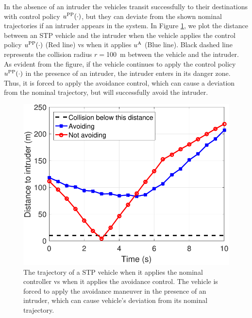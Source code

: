 In the absence of an intruder the vehicles transit successfully to their destinations with control policy $u^{\text{PP}}(\cdot)$, but they can deviate from the shown nominal trajectories if an intruder appears in the system. In Figure \ref{fig:trajComparison}, we plot the distance between an STP vehicle and the intruder when the vehicle applies the control policy $u^{\text{PP}}(\cdot)$ (Red line) vs when it applies ${u^{\text{A}}}$ (Blue line). Black dashed line represents the collision radius $r=$\SI{100}{\m} between the vehicle and the intruder. As evident from the figure, if the vehicle continues to apply the control policy $u^{\text{PP}}(\cdot)$ in the presence of an intruder, the intruder enters in its danger zone. Thus, it is forced to apply the avoidance control, which can cause a deviation from the nominal trajectory, but will successfully avoid the intruder.
\begin{figure}
  \centering
  \includegraphics[width=0.6\columnwidth]{figs/simulateIntruder}
  \caption{The trajectory of a STP vehicle when it applies the nominal controller vs when it applies the avoidance control. The vehicle is forced to apply the avoidance maneuver in the presence of an intruder, which can cause vehicle's deviation from its nominal trajectory.}
  \label{fig:trajComparison}
\end{figure}

